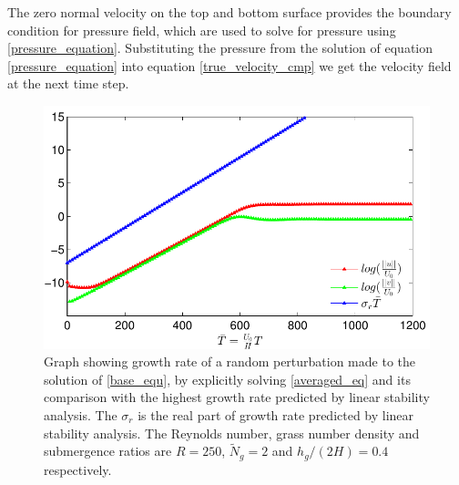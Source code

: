 \documentclass[12pt]{report}   %
\newcommand{\Ndg}{\tilde{N}_g}
\begin{document}
The zero normal velocity on the top and bottom surface provides the boundary condition for pressure field, which are used to solve for pressure using \eqref{pressure_equation}. Substituting the pressure from the solution of equation \eqref{pressure_equation} into equation \eqref{true_velocity_cmp} we get the velocity field at the next time step. 
\begin{figure}
\centerline{\includegraphics{LinearStabilityVsCFD1} }
\caption [Graph showing growth rate of a random perturbation made to the solution of \eqref{base_equ}, by explicitly solving \eqref{averaged_eq} and its comparison with the highest growth rate predicted by linear stability analysis.  ] {Graph showing growth rate of a random perturbation made to the solution of \eqref{base_equ}, by explicitly solving \eqref{averaged_eq} and its comparison with the highest growth rate predicted by linear stability analysis. The $\sigma_r$ is the real part of growth rate predicted by linear stability analysis. The  Reynolds number, grass number density and submergence ratios are $R=250$, $\Ndg=2$ and $h_{g}/(2H) = 0.4$ respectively.}
\label{CFD_vs_LinearStabilityGrowthRate}
\end{figure}
\end{document}
